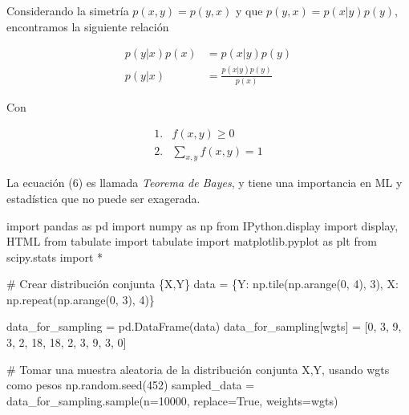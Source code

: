 \documentclass[
  letterpaper,
  DIV=11,
  numbers=noendperiod]{scrartcl}
\newenvironment{Shaded}{\begin{snugshade}}{\end{snugshade}}
\newcommand{\CommentTok}[1]{\textcolor[rgb]{0.37,0.37,0.37}{#1}}
\newcommand{\DecValTok}[1]{\textcolor[rgb]{0.68,0.00,0.00}{#1}}
\newcommand{\ImportTok}[1]{\textcolor[rgb]{0.00,0.46,0.62}{#1}}
\newcommand{\NormalTok}[1]{\textcolor[rgb]{0.00,0.23,0.31}{#1}}
\newcommand{\OperatorTok}[1]{\textcolor[rgb]{0.37,0.37,0.37}{#1}}
\newcommand{\StringTok}[1]{\textcolor[rgb]{0.13,0.47,0.30}{#1}}
\newcommand{\VariableTok}[1]{\textcolor[rgb]{0.07,0.07,0.07}{#1}}
\begin{document}
Considerando la simetría \(p(x,y) = p(y,x)\) y que
\(p(y,x) = p(x|y)p(y)\), encontramos la siguiente relación

\begin{align*}
p(y|x)p(x) &= p(x|y)p(y)\\
p(y|x) &= \frac{ p(x|y)p(y)}{p(x)}\tag{6}
\end{align*}

Con

\begin{align*}
1.  & f(x, y) \geq 0\\
2.  & \sum_{x,y}f(x, y) = 1
\end{align*}

La ecuación (6) es llamada \emph{Teorema de Bayes}, y tiene una
importancia en ML y estadística que no puede ser exagerada.

\begin{Shaded}
\begin{Highlighting}[]
\ImportTok{import}\NormalTok{ pandas }\ImportTok{as}\NormalTok{ pd}
\ImportTok{import}\NormalTok{ numpy }\ImportTok{as}\NormalTok{ np}
\ImportTok{from}\NormalTok{ IPython.display }\ImportTok{import}\NormalTok{ display, HTML}
\ImportTok{from}\NormalTok{ tabulate }\ImportTok{import}\NormalTok{ tabulate}
\ImportTok{import}\NormalTok{ matplotlib.pyplot }\ImportTok{as}\NormalTok{ plt}
\ImportTok{from}\NormalTok{ scipy.stats }\ImportTok{import} \OperatorTok{*}

\CommentTok{\# Crear distribución conjunta \{X,Y\}}
\NormalTok{data }\OperatorTok{=}\NormalTok{ \{}\StringTok{\textquotesingle{}Y\textquotesingle{}}\NormalTok{: np.tile(np.arange(}\DecValTok{0}\NormalTok{, }\DecValTok{4}\NormalTok{), }\DecValTok{3}\NormalTok{), }
        \StringTok{\textquotesingle{}X\textquotesingle{}}\NormalTok{: np.repeat(np.arange(}\DecValTok{0}\NormalTok{, }\DecValTok{3}\NormalTok{), }\DecValTok{4}\NormalTok{)\}}

\NormalTok{data\_for\_sampling }\OperatorTok{=}\NormalTok{ pd.DataFrame(data)}
\NormalTok{data\_for\_sampling[}\StringTok{\textquotesingle{}wgts\textquotesingle{}}\NormalTok{] }\OperatorTok{=}\NormalTok{ [}\DecValTok{0}\NormalTok{, }\DecValTok{3}\NormalTok{, }\DecValTok{9}\NormalTok{, }\DecValTok{3}\NormalTok{, }\DecValTok{2}\NormalTok{, }\DecValTok{18}\NormalTok{, }\DecValTok{18}\NormalTok{, }\DecValTok{2}\NormalTok{, }\DecValTok{3}\NormalTok{, }\DecValTok{9}\NormalTok{, }\DecValTok{3}\NormalTok{, }\DecValTok{0}\NormalTok{]}

\CommentTok{\# Tomar una muestra aleatoria de la distribución conjunta X,Y, usando wgts como pesos}
\NormalTok{np.random.seed(}\DecValTok{452}\NormalTok{)}
\NormalTok{sampled\_data }\OperatorTok{=}\NormalTok{ data\_for\_sampling.sample(n}\OperatorTok{=}\DecValTok{10000}\NormalTok{, replace}\OperatorTok{=}\VariableTok{True}\NormalTok{, weights}\OperatorTok{=}\StringTok{\textquotesingle{}wgts\textquotesingle{}}\NormalTok{)}


\end{Highlighting}
\end{Shaded}
\end{document}
